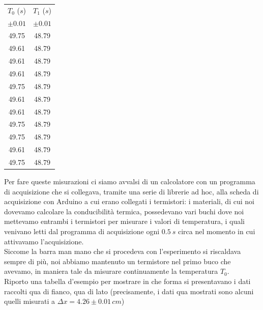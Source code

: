 \documentclass{article}
\begin{document}
\begin{table}
\centering
\begin{tabular}{c c} \toprule
$T_0$ ($s$) & $T_1$ ($s$) \\
$\pm 0.01$ & $\pm 0.01$ \\ \toprule
49.75 &	48.79 \\ \midrule
49.61 &	48.79 \\ \midrule
49.61 &	48.79 \\ \midrule
49.61 &	48.79 \\ \midrule
49.75 &	48.79 \\ \midrule
49.61 &	48.79 \\ \midrule
49.61 &	48.79 \\ \midrule
49.75 &	48.79 \\ \midrule
49.75 &	48.79 \\ \midrule
49.61 &	48.79 \\ \midrule
49.75 &	48.79 \\ \bottomrule
\end{tabular}
\end{table}

\noindent Per fare queste misurazioni ci siamo avvalsi di un calcolatore con un programma di acquisizione che si collegava, tramite una serie di librerie ad hoc, alla scheda di acquisizione con Arduino a cui erano collegati i termistori: i materiali, di cui noi dovevamo calcolare la conducibilità termica, possedevano vari buchi dove noi mettevamo entrambi i termistori per misurare i valori di temperatura, i quali venivano letti dal programma di acquisizione ogni $0.5 \ s$ circa nel momento in cui attivavamo l'acquisizione. \\
Siccome la barra man mano che si procedeva con l'esperimento si riscaldava sempre di più, noi abbiamo mantenuto un termistore nel primo buco che avevamo, in maniera tale da misurare continuamente la temperatura $T_0$. \\
Riporto una tabella d'esempio per mostrare in che forma si presentavano i dati raccolti qua di fianco, qua di lato (precisamente, i dati qua mostrati sono alcuni quelli misurati a $\Delta x = 4.26 \pm 0.01 \, \unit{cm}$)
\end{document}
